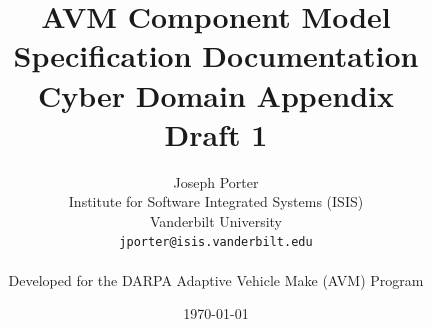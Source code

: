\documentclass{report}
\begin{document}
\title{AVM Component Model Specification Documentation\\Cyber Domain Appendix\\Draft 1}
\author{Joseph Porter\\
	Institute for Software Integrated Systems (ISIS)\\
	Vanderbilt University\\
	\texttt{jporter@isis.vanderbilt.edu}\\
	\\
	Developed for the DARPA Adaptive Vehicle Make (AVM) Program}
\date{\today}


\maketitle

\tableofcontents


\end{document}
